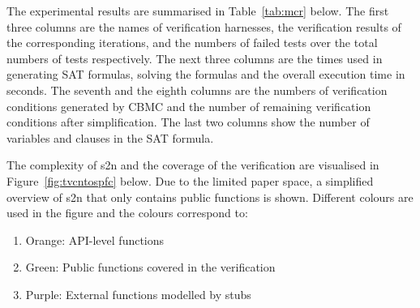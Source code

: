 



The experimental results are summarised in Table~\ref{tab:mcr} below. The first three columns are the names of verification harnesses, the verification results of the corresponding iterations, and the numbers of failed tests over the total numbers of tests respectively. The next three columns are the times used in generating 
SAT formulas, solving the formulas and the overall execution time in seconds. The seventh and the eighth columns are the numbers of verification conditions generated by CBMC and the number of remaining verification conditions after simplification. The last two columns show the number of variables and clauses in the SAT formula.



The complexity of s2n and the coverage of the verification are visualised in Figure~\ref{fig:tvcntospfc} below. Due to the limited paper space, a simplified overview of s2n that only contains public functions is shown. Different colours are used in the figure and the colours correspond to:
\begin{enumerate}[nolistsep]
    \item Orange: API-level functions
    \item Green: Public functions covered in the verification
    \item Purple: External functions modelled by stubs
\end{enumerate}

